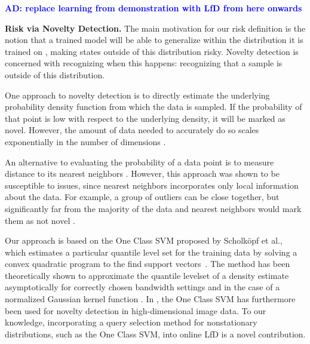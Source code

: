 \documentclass[10pt, conference]{ieeeconf}      %
\newcommand{\adnote}[1]{\ifthenelse{ \boolean{include-notes}}%
 {\textcolor{blue}{\textbf{AD: #1}}}{}}
\begin{document}


\adnote{replace learning from demonstration with LfD from here onwards}

\noindent\textbf{Risk via Novelty Detection.}
The main motivation for our risk definition is the notion that a trained model will be able to generalize within the distribution it is
trained on \cite{tokdar2010importance}, making states outside of this distribution risky. Novelty detection \cite{hodge2004survey} is concerned with recognizing when this happens: recognizing that a sample is outside of this distribution.

One approach to novelty detection is to directly estimate the underlying probability density function from which the data is sampled. If the probability of that point is low with respect to the underlying density, it will be marked as novel. However, the amount of data needed to accurately do so scales exponentially in the number of dimensions \cite{nadaraya1964estimating}.

An alternative to evaluating the probability of a data point is to measure distance to its nearest neighbors \cite{knox1998algorithms}. However, this approach was shown to be
susceptible to issues, since nearest neighbors  incorporates only local information about the data. For example, a group of outliers can be close together, but significantly far from the majority of the data and nearest neighbors would mark them as not novel \cite{hodge2004survey}.

Our approach is based on the One Class SVM proposed by Scholk{\"o}pf et al., which estimates a particular quantile level set for the training data by solving a convex quadratic program  to the find support
vectors~\cite{scholkopf2001estimating}. The method has been theoretically shown to approximate the quantile levelset of a density estimate
asymptotically for correctly chosen bandwidth settings and in the case of a normalized Gaussian kernel function \cite{vert2006consistency}. 
In \cite{liu2014unsupervised}, the One Class SVM has furthermore been used for novelty detection in high-dimensional image data. To our knowledge, incorporating a query selection method for nonstationary distributions, such as the One Class SVM, into online LfD is a novel contribution.
\end{document}

